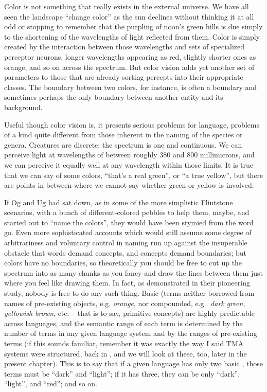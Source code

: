Color is not something that really exists in the external universe. We have all seen the landscape ``change color'' as the sun declines without thinking it at all odd or stopping to remember that the purpling of noon's green hills is due simply to the shortening of the wavelengths of light reflected from them. Color is simply created by the interaction between those wavelengths and sets of specialized perceptor neurons, longer wavelengths appearing as red, slightly shorter ones as orange, and so on across the spectrum. But color vision adds yet another set of parameters to those that are already sorting percepts into their
appropriate classes. The boundary between two colors, for instance, is often a boundary and sometimes perhaps the only boundary between another entity and its background.

Useful though color vision is, it presents serious problems for language, problems of a kind quite different from those inherent in the naming of the species or genera. Creatures are discrete; the spectrum is one and continuous. We can perceive light at wavelengths of between roughly 380 and 800 millimicrons, and we can perceive it equally well at any wavelength within those limits. It is true that we can say of some colors, ``that's a real green'', or ``a true yellow'', but there are points in between where we cannot say whether green or yellow is involved.

If Og and Ug had sat down, as in some of the more simplistic Flintstone scenarios, with a bunch of different-colored pebbles to help them, maybe, and started out to ``name the colors'', they would have been stymied from the word go. Even more sophisticated accounts which would still assume some degree of arbitrariness and voluntary control in naming run up against the insuperable obstacle that words demand concepts, and concepts demand boundaries; but colors have no boundaries, so theoretically you should be free to cut up the spectrum into as many chunks as you fancy and draw the lines between them just where you feel like drawing them. In fact, as \citet{Berlin1969} demonstrated in their pioneering study, nobody is free to do any such thing. Basic  (terms neither borrowed from names of pre-existing objects, e.g. \textit{orange}, nor compounded, e.g.. \textit{dark green}, \textit{yellowish brown}, etc. -- that is to say, primitive concepts) are highly predictable across languages, and the semantic range of each term is determined by the number of terms in any given language system and by the ranges of pre-existing terms (if this sounds familiar, remember it was exactly the way I said TMA systems were structured, back in , and we will look at these, too, later in the present chapter). This is to say that if a given language has only two basic , those terms must be ``dark'' and ``light''; if it has three, they can be only ``dark'', ``light'', and ``red''; and so on.

